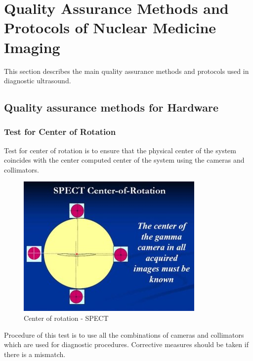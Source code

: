 \documentclass[12pt]{article}
\def \topic{Nuclear Medicine Imaging}
\begin{document}
\newpage
\pagebreak
\section{Quality Assurance Methods and Protocols of \topic}
This section describes the main quality assurance methods and protocols used in diagnostic ultrasound. 

\subsection{Quality assurance methods for Hardware}
\subsubsection{Test for Center of Rotation}
Test for center of rotation is to ensure that the physical center of the system coincides with the center computed center of the system using the cameras and collimators. 
\begin{figure}[h!]
    \centering
    \includegraphics[width=0.45\linewidth]{cor.jpg}
    \caption{\small{Center of rotation - SPECT}}
    \label{fig:Center of rotation - SPECT}
\end{figure}
Procedure of this test is to use all the combinations of cameras and collimators which are used for diagnostic procedures. Corrective measures should be taken if there is a mismatch. 
\end{document}
